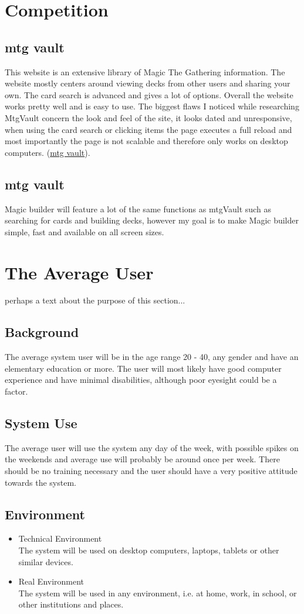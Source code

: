 \documentclass[paper=a4, fontsize=11pt]{scrartcl} %
\numberwithin{equation}{section} %
\numberwithin{figure}{section} %
\numberwithin{table}{section} %
\begin{document}
\section{Competition}
\subsection{mtg vault}
This website is an extensive library of Magic The Gathering information. The website mostly centers around viewing decks from other users and sharing your own. The card search is advanced and gives a lot of options. Overall the website works pretty well and is easy to use. The biggest flaws I noticed while researching MtgVault concern the look and feel of the site, it looks dated and unresponsive, when using the card search or clicking items the page executes a full reload and most importantly the page is not scalable and therefore only works on desktop computers.
(\href{http://www.mtgvault.com/}{mtg vault}).
\subsection{mtg vault}
Magic builder will feature a lot of the same functions as mtgVault such as searching for cards and building decks, however my goal is to make Magic builder simple, fast and available on all screen sizes. 

\section{The Average User}
perhaps a text about the purpose of this section...
\subsection{Background}
The average system user will be in the age range 20 - 40, any gender and have an elementary education or more. The user will most likely have good computer experience and have minimal disabilities, although poor eyesight could be a factor.
\subsection{System Use}
The average user will use the system any day of the week, with possible spikes on the weekends and average use will probably be around once per week. There should be no training necessary and the user should have a very positive attitude towards the system.
\subsection{Environment}
\begin{itemize}
  \item Technical Environment \\
  The system will be used on desktop computers, laptops, tablets or other similar devices.
  \item Real Environment \\
  The system will be used in any environment, i.e. at home, work, in school, or other institutions and places.
\end{itemize}
\end{document}
